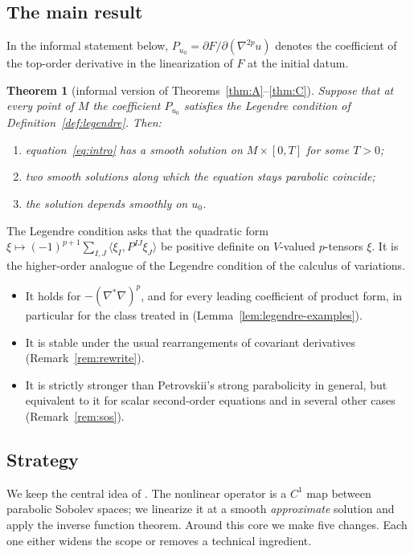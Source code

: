 \documentclass[11pt,reqno]{amsart}
\newtheorem{theorem}{Theorem}[section]
\theoremstyle{definition}
\theoremstyle{remark}
\newcommand{\ip}[2]{\langle #1,#2\rangle}
\newcommand{\Lap}{\nabla^{*}\nabla}
\numberwithin{equation}{section}
\begin{document}
\subsection{The main result}

In the informal statement below, $P_{u_0}=\partial F/\partial(\nabla^{2p}u)$ denotes the coefficient
of the top-order derivative in the linearization of $F$ at the initial datum.

\begin{theorem}[informal version of Theorems~\ref{thm:A}--\ref{thm:C}]\label{thm:informal}
Suppose that at every point of $M$ the coefficient $P_{u_0}$ satisfies the Legendre condition of
Definition~\ref{def:legendre}. Then:
\begin{enumerate}[nosep]
\item equation~\eqref{eq:intro} has a smooth solution on $M\times[0,T]$ for some $T>0$;
\item two smooth solutions along which the equation stays parabolic coincide;
\item the solution depends smoothly on $u_0$.
\end{enumerate}
\end{theorem}

The Legendre condition asks that the quadratic form
$\xi\mapsto(-1)^{p+1}\sum_{I,J}\ip{\xi_I}{P^{IJ}\xi_J}$ be positive definite on $V$-valued
$p$-tensors $\xi$. It is the higher-order analogue of the Legendre condition of the calculus of
variations.
\begin{itemize}[nosep]
\item It holds for $-(\Lap)^p$, and for every leading coefficient of product form, in particular for
  the class treated in \cite{MM} (Lemma~\ref{lem:legendre-examples}).
\item It is stable under the usual rearrangements of covariant derivatives
  (Remark~\ref{rem:rewrite}).
\item It is strictly stronger than Petrovskii's strong parabolicity in general, but equivalent to it
  for scalar second-order equations and in several other cases (Remark~\ref{rem:sos}).
\end{itemize}

\subsection{Strategy}

We keep the central idea of \cite{MM}. The nonlinear operator is a $C^1$ map between parabolic Sobolev
spaces; we linearize it at a smooth \emph{approximate} solution and apply the inverse function theorem.
Around this core we make five changes. Each one either widens the scope or removes a technical
ingredient.
\end{document}

